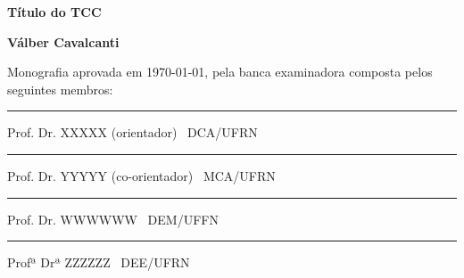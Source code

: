 %
%

\begin{titlepage}

\begin{center}

\LARGE

\textbf{Título do TCC}

\vfill

\Large

\textbf{Válber Cavalcanti}

\end{center}

\vfill

\noindent
Monografia aprovada em \today, pela banca examinadora composta
pelos seguintes membros:


\begin{center}

\vspace{1.5cm}\rule{0.95\linewidth}{1pt}
\parbox{0.9\linewidth}{%
Prof. Dr. XXXXX (orientador) \dotfill\ DCA/UFRN}

\vspace{1.5cm}\rule{0.95\linewidth}{1pt}
\parbox{0.9\linewidth}{%
Prof. Dr. YYYYY (co-orientador) \dotfill\ MCA/UFRN}

\vspace{1.5cm}\rule{0.95\linewidth}{1pt}
\parbox{0.9\linewidth}{%
Prof. Dr. WWWWWW \dotfill\ DEM/UFFN}

\vspace{1.5cm}\rule{0.95\linewidth}{1pt}
\parbox{0.9\linewidth}{%
Profª Drª ZZZZZZ \dotfill\ DEE/UFRN}

\end{center}

\end{titlepage}

%
%


